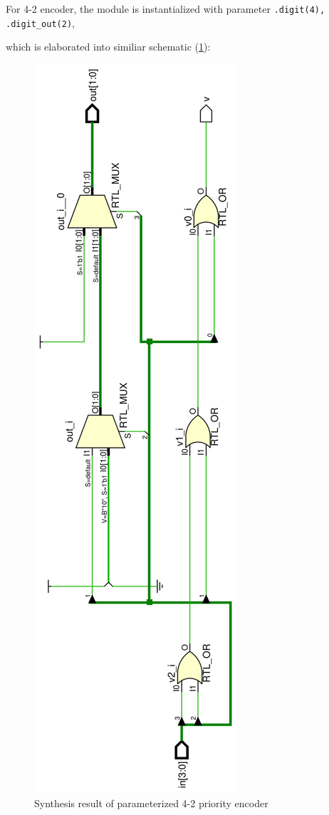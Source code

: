 \documentclass[journal, onecolumn]{IEEEtran}
\begin{document}
For 4-2 encoder, the module is instantialized with parameter \lstinline{.digit(4), .digit_out(2)},



which is elaborated into similiar schematic (\ref{cascaded_42_encoder}):

\begin{figure}[htpb]
	\begin{center}
		\includegraphics[height=0.80\textwidth, angle=270]{report_lab3.assets/encoder42_cas_elab.png}
		\caption{Synthesis result of parameterized 4-2 priority encoder}
		\label{cascaded_42_encoder}
	\end{center}
\end{figure}
\end{document}
